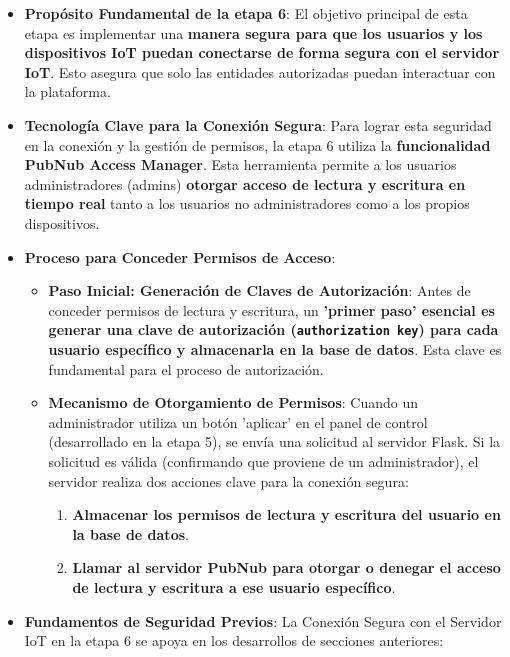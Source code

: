 \documentclass{report}
\begin{document}
\begin{itemize}
    \item \textbf{Propósito Fundamental de la etapa 6}: El objetivo principal de esta etapa es implementar una \textbf{manera segura para que los 
    usuarios y los dispositivos IoT puedan conectarse de forma segura con el servidor IoT}. Esto asegura que solo las entidades autorizadas puedan 
    interactuar con la plataforma.
    \item \textbf{Tecnología Clave para la Conexión Segura}: Para lograr esta seguridad en la conexión y la gestión de permisos, la etapa 6 
    utiliza la \textbf{funcionalidad PubNub Access Manager}. Esta herramienta permite a los usuarios administradores (admins) \textbf{otorgar acceso de lectura y escritura en tiempo real} tanto a los usuarios no administradores como a los propios dispositivos.
    \item \textbf{Proceso para Conceder Permisos de Acceso}:
    \begin{itemize}
        \item \textbf{Paso Inicial: Generación de Claves de Autorización}: Antes de conceder permisos de lectura y escritura, un \textbf{ 'primer paso' 
        esencial es generar una clave de autorización (\texttt{authorization key}) para cada usuario específico y almacenarla en la base de datos}. 
        Esta clave es fundamental para el proceso de autorización.
        \item \textbf{Mecanismo de Otorgamiento de Permisos}: Cuando un administrador utiliza un botón  'aplicar' en el panel de control (desarrollado 
        en la etapa 5), se envía una solicitud al servidor Flask. Si la solicitud es válida (confirmando que proviene de un administrador), el servidor realiza dos acciones clave para la conexión segura:
        \begin{enumerate}
            \item \textbf{Almacenar los permisos de lectura y escritura del usuario en la base de datos}.
            \item \textbf{Llamar al servidor PubNub para otorgar o denegar el acceso de lectura y escritura a ese usuario específico}.
        \end{enumerate}
    \end{itemize}
    \item \textbf{Fundamentos de Seguridad Previos}: La Conexión Segura con el Servidor IoT en la etapa 6 se apoya en los desarrollos de secciones anteriores:
    \begin{itemize}

\end{itemize}
\end{itemize}
\end{document}

